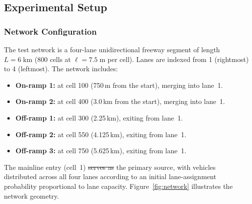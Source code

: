 \documentclass[review,number]{elsarticle} %
\providecommand{\DIFaddtex}[1]{{\protect\color{blue}\uwave{#1}}} %
\providecommand{\DIFdeltex}[1]{{\protect\color{red}\sout{#1}}}                      %
\providecommand{\DIFaddbegin}{} %
\providecommand{\DIFaddend}{} %
\providecommand{\DIFdelbegin}{} %
\providecommand{\DIFdelend}{} %
\providecommand{\DIFadd}[1]{\texorpdfstring{\DIFaddtex{#1}}{#1}} %
\providecommand{\DIFdel}[1]{\texorpdfstring{\DIFdeltex{#1}}{}} %
\newcommand{\DIFscaledelfig}{0.5}
\newlength{\DIFdelgraphicswidth} %
\newlength{\DIFdelgraphicsheight} %
\newcommand{\DIFaddincludegraphics}[2][]{{\color{blue}\fbox{\DIFOincludegraphics[#1]{#2}}}} %
\newcommand{\DIFdelincludegraphics}[2][]{%
\sbox{\DIFdelgraphicsbox}{\DIFOincludegraphics[#1]{#2}}%
\settoboxwidth{\DIFdelgraphicswidth}{\DIFdelgraphicsbox} %
\settoboxtotalheight{\DIFdelgraphicsheight}{\DIFdelgraphicsbox} %
\scalebox{\DIFscaledelfig}{%
\parbox[b]{\DIFdelgraphicswidth}{\usebox{\DIFdelgraphicsbox}\\[-\baselineskip] \rule{\DIFdelgraphicswidth}{0em}}\llap{\resizebox{\DIFdelgraphicswidth}{\DIFdelgraphicsheight}{%
\setlength{\unitlength}{\DIFdelgraphicswidth}%
\begin{picture}(1,1)%
\thicklines\linethickness{2pt} %
{\color[rgb]{1,0,0}\put(0,0){\framebox(1,1){}}}%
{\color[rgb]{1,0,0}\put(0,0){\line( 1,1){1}}}%
{\color[rgb]{1,0,0}\put(0,1){\line(1,-1){1}}}%
\end{picture}%
}\hspace*{3pt}}} %
} %
\DeclareRobustCommand{\DIFaddbegin}{\DIFOaddbegin \let\includegraphics\DIFaddincludegraphics} %
\DeclareRobustCommand{\DIFaddend}{\DIFOaddend \let\includegraphics\DIFOincludegraphics} %
\DeclareRobustCommand{\DIFdelbegin}{\DIFOdelbegin \let\includegraphics\DIFdelincludegraphics} %
\DeclareRobustCommand{\DIFdelend}{\DIFOaddend \let\includegraphics\DIFOincludegraphics} %
\begin{document}
\subsection{Experimental Setup}
\label{sec:exp_setup}

\subsubsection{Network Configuration}

The test network is a four-lane unidirectional freeway segment of length $L = 6\;\text{km}$ (800 cells at $\ell = 7.5\;\text{m}$ per cell). Lanes are indexed from 1 (rightmost) to 4 (leftmost). The network includes:
\begin{itemize}
    \item \textbf{On-ramp 1:} at cell 100 (750\,m from the start), merging into lane~1.
    \item \textbf{On-ramp 2:} at cell 400 (3.0\,km from the start), merging into lane~1.
    \item \textbf{Off-ramp 1:} at cell 300 (2.25\,km), exiting from lane~1.
    \item \textbf{Off-ramp 2:} at cell 550 (4.125\,km), exiting from lane~1.
    \item \textbf{Off-ramp 3:} at cell 750 (5.625\,km), exiting from lane~1.
\end{itemize}

The mainline entry (cell~1) \DIFdelbegin \DIFdel{serves as }\DIFdelend \DIFaddbegin \DIFadd{is }\DIFaddend the primary source, with vehicles distributed across all four lanes according to an initial lane-assignment probability proportional to lane capacity. Figure~\ref{fig:network} illustrates the network geometry.
\end{document}
